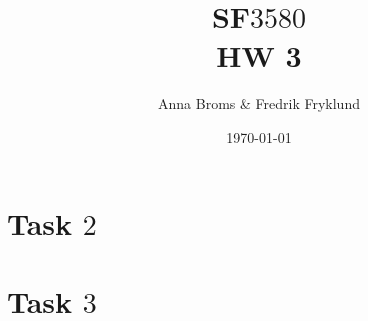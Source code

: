 \documentclass[a4paper]{article}
\title{SF$3580$\\HW 3}
\author{Anna Broms \& Fredrik Fryklund}
\date{\today}
\begin{document}
\maketitle

 \section*{Task $2$}
 

 \section*{Task $3$}
 
%
\end{document}

